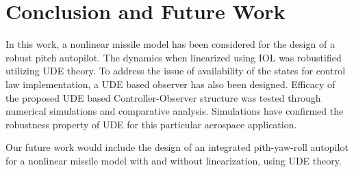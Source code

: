 \documentclass[conference]{IEEEtran}
\begin{document}
\section{Conclusion and Future Work} \label{conclusion}

	In this work, a nonlinear missile model has been considered for the design of a robust pitch autopilot. The dynamics when linearized using IOL was robustified utilizing UDE theory. To address the issue of availability of the states for control law implementation, a UDE based observer has also been designed. Efficacy of the proposed UDE based Controller-Observer structure was tested through numerical simulations and comparative analysis. Simulations have confirmed the robustness property of UDE for this particular aerospace application. 
	
	Our future work would include the design of an integrated pith-yaw-roll autopilot for a nonlinear missile model with and without linearization, using UDE theory.
\end{document}

